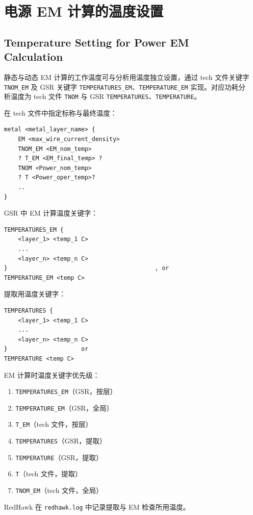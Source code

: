 \section{电源 EM 计算的温度设置}
\subsection*{Temperature Setting for Power EM Calculation}

静态与动态 EM 计算的工作温度可与分析用温度独立设置，通过 tech 文件关键字 \texttt{TNOM\_EM} 及 GSR 关键字 \texttt{TEMPERATURES\_EM}、\texttt{TEMPERATURE\_EM} 实现。对应功耗分析温度为 tech 文件 \texttt{TNOM} 与 GSR \texttt{TEMPERATURES}、\texttt{TEMPERATURE}。

在 tech 文件中指定标称与最终温度：
\begin{lstlisting}
metal <metal_layer_name> {
    EM <max_wire_current_density>
    TNOM_EM <EM_nom_temp>
    ? T_EM <EM_final_temp> ?
    TNOM <Power_nom_temp>
    ? T <Power_oper_temp>?
    ..
}
\end{lstlisting}

GSR 中 EM 计算温度关键字：
\begin{lstlisting}
TEMPERATURES_EM {
    <layer_1> <temp_1 C>
    ...
    <layer_n> <temp_n C>
}                                          , or
TEMPERATURE_EM <temp C>
\end{lstlisting}

提取用温度关键字：
\begin{lstlisting}
TEMPERATURES {
    <layer_1> <temp_1 C>
    ...
    <layer_n> <temp_n C>
}                     or
TEMPERATURE <temp C>
\end{lstlisting}

EM 计算时温度关键字优先级：
\begin{enumerate}
  \item \texttt{TEMPERATURES\_EM}（GSR，按层）
  \item \texttt{TEMPERATURE\_EM}（GSR，全局）
  \item \texttt{T\_EM}（tech 文件，按层）
  \item \texttt{TEMPERATURES}（GSR，提取）
  \item \texttt{TEMPERATURE}（GSR，提取）
  \item \texttt{T}（tech 文件，提取）
  \item \texttt{TNOM\_EM}（tech 文件，全局）
\end{enumerate}

RedHawk 在 \texttt{redhawk.log} 中记录提取与 EM 检查所用温度。

